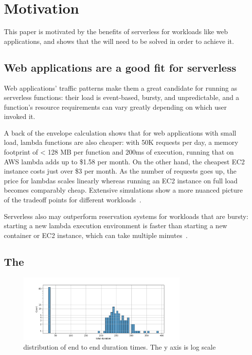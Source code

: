 \section{Motivation}\label{motivation}

This paper is motivated by the benefits of serverless for workloads like web
applications, and shows that the \problem{} will need to be solved in order to
achieve it.

\subsection{Web applications are a good fit for serverless}

Web applications' traffic patterns make them a great candidate for running as
serverless functions: their load is event-based, bursty, and unpredictable, and a
function's resource requirements can vary greatly depending on which user
invoked it.

A back of the envelope calculation shows that for web applications with small
load, lambda functions are also cheaper: with 50K requests per day, a memory
footprint of < 128 MB per function and 200ms of execution, running that on AWS
lambda adds up to \$1.58 per month. On the other hand, the cheapest EC2 instance
costs just over \$3 per month. As the number of requests goes up, the price for
lambdas scales linearly whereas running an EC2 instance on full load becomes
comparably cheap. Extensive simulations show a more nuanced picture of the
tradeoff points for different workloads~\cite{econ-of-serverless,trek10-blog}.

Serverless also may outperform reservation systems for workloads that are
bursty: starting a new lambda execution environment is faster than starting a
new container or EC2 instance, which can take multiple
minutes~\cite{ec2-autoscaling}.


\subsection{The \problem{}}


\begin{figure}[t!]
    \centering
      \includegraphics[width=8.5cm]{img/lambda_total_durations.png}
      \caption{ distribution of end to end duration times. The y axis is log scale }
    \label{fig:lambda-total-durations}
\end{figure}



